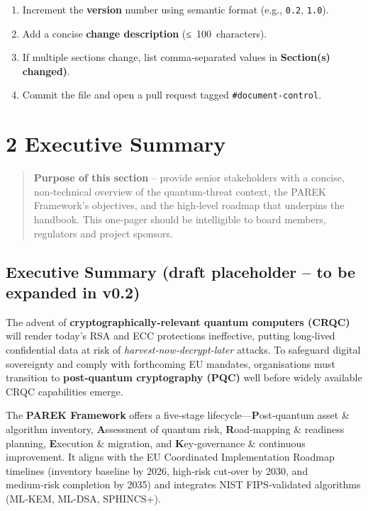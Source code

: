 \documentclass[
  english,
]{article}
\providecommand{\tightlist}{%
  \setlength{\itemsep}{0pt}\setlength{\parskip}{0pt}}
\begin{document}
\begin{enumerate}
\def\labelenumi{\arabic{enumi}.}
\tightlist
\item
  Increment the \textbf{version} number using semantic format (e.g.,
  \texttt{0.2}, \texttt{1.0}).\\
\item
  Add a concise \textbf{change description} (≤~100~characters).\\
\item
  If multiple sections change, list comma‑separated values in
  \textbf{Section(s) changed)}.\\
\item
  Commit the file and open a pull request tagged
  \texttt{\#document‑control}.
\end{enumerate}

\section{2 Executive Summary}\label{executive-summary}

\begin{quote}
\textbf{Purpose of this section} -- provide senior stakeholders with a
concise, non‑technical overview of the quantum‑threat context, the PAREK
Framework's objectives, and the high‑level roadmap that underpins the
handbook. This one‑pager should be intelligible to board members,
regulators and project sponsors.
\end{quote}

\subsection{Executive Summary (draft placeholder -- to be expanded in
v0.2)}\label{executive-summary-draft-placeholder-to-be-expanded-in-v0.2}

The advent of \textbf{cryptographically‑relevant quantum computers
(CRQC)} will render today's RSA and ECC protections ineffective, putting
long‑lived confidential data at risk of \emph{harvest‑now‑decrypt‑later}
attacks. To safeguard digital sovereignty and comply with forthcoming EU
mandates, organisations must transition to \textbf{post‑quantum
cryptography (PQC)} well before widely available CRQC capabilities
emerge.

The \textbf{PAREK Framework} offers a five‑stage
lifecycle---\textbf{P}ost‑quantum asset \& algorithm inventory,
\textbf{A}ssessment of quantum risk, \textbf{R}oad‑mapping \& readiness
planning, \textbf{E}xecution \& migration, and \textbf{K}ey‑governance
\& continuous improvement. It aligns with the EU Coordinated
Implementation Roadmap timelines (inventory baseline by 2026, high‑risk
cut‑over by 2030, and medium‑risk completion by 2035) and integrates
NIST FIPS‑validated algorithms (ML‑KEM, ML‑DSA, SPHINCS+).
\end{document}

